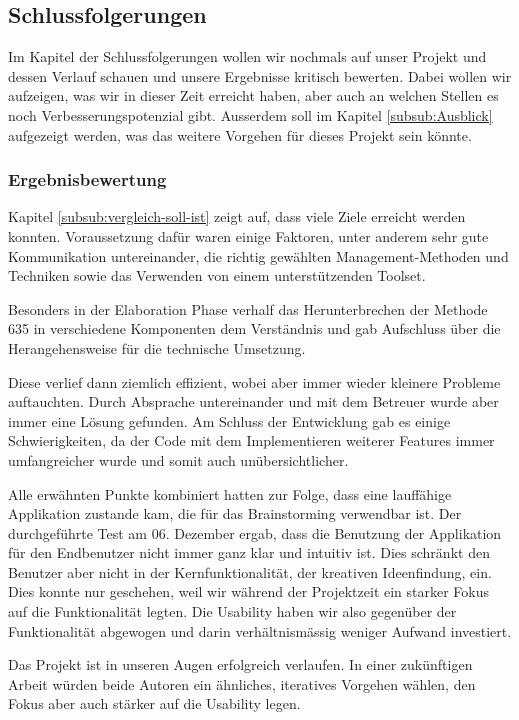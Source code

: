 \subsection{Schlussfolgerungen}
Im Kapitel der Schlussfolgerungen wollen wir nochmals auf unser Projekt und dessen Verlauf schauen und unsere Ergebnisse kritisch bewerten. Dabei wollen wir aufzeigen, was wir in dieser Zeit erreicht haben, aber auch an welchen Stellen es noch Verbesserungspotenzial gibt. Ausserdem soll im Kapitel \ref{subsub:Ausblick} aufgezeigt werden, was das weitere Vorgehen für dieses Projekt sein könnte.

\subsubsection{Ergebnisbewertung}
Kapitel \ref{subsub:vergleich-soll-ist} zeigt auf, dass viele Ziele erreicht werden konnten. Voraussetzung dafür waren einige Faktoren, unter anderem sehr gute Kommunikation untereinander, die richtig gewählten Management-Methoden und Techniken sowie das Verwenden von einem unterstützenden Toolset. 

Besonders in der Elaboration Phase verhalf das Herunterbrechen der Methode 635 in verschiedene Komponenten dem Verständnis und gab Aufschluss über die Herangehensweise für die technische Umsetzung. 

Diese verlief dann ziemlich effizient, wobei aber immer wieder kleinere Probleme auftauchten. Durch Absprache untereinander und mit dem Betreuer wurde aber immer eine Lösung gefunden. Am Schluss der Entwicklung gab es einige Schwierigkeiten, da der Code mit dem Implementieren weiterer Features immer umfangreicher wurde und somit auch unübersichtlicher. 

Alle erwähnten Punkte kombiniert hatten zur Folge, dass eine lauffähige Applikation zustande kam, die für das Brainstorming verwendbar ist. Der durchgeführte Test am 06. Dezember ergab, dass die Benutzung der Applikation für den Endbenutzer nicht immer ganz klar und intuitiv ist. Dies schränkt den Benutzer aber nicht in der Kernfunktionalität, der kreativen Ideenfindung, ein. Dies konnte nur geschehen, weil wir während der Projektzeit ein starker Fokus auf die Funktionalität legten. Die Usability haben wir also gegenüber der Funktionalität abgewogen und darin verhältnismässig weniger Aufwand investiert. 

Das Projekt ist in unseren Augen erfolgreich verlaufen. In einer zukünftigen Arbeit würden beide Autoren ein ähnliches, iteratives Vorgehen wählen, den Fokus aber auch stärker auf die Usability legen. 

